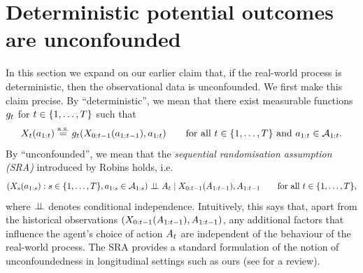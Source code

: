 
\section{Deterministic potential outcomes are unconfounded} \label{eq:deterministic-potential-outcomes-are-unconfounded}

In this section we expand on our earlier claim that, if the real-world process is deterministic, then the observational data is unconfounded.
We first make this claim precise.
By ``deterministic'', we mean that there exist measurable functions $g_t$ for $t \in \{1, \ldots, T\}$ such that
\begin{equation} \label{eq:potential-outcomes-are-deterministic}
    X_t(a_{1:t}) \overset{\mathrm{a.s.}}{=} g_t(X_{0:t-1}(a_{1:t-1}), a_{1:t}) \qquad \text{for all $t \in \{1, \ldots, T\}$ and $a_{1:t} \in \mathcal{A}_{1:t}$.}
\end{equation}
By ``unconfounded'', we mean that the \emph{sequential randomisation assumption (SRA)} introduced by Robins \citep{robins1986new} holds, i.e.\
\begin{equation} \label{eq:actions-are-unconfounded}
    (X_{s}(a_{1:s}) : s \in \{1, \ldots, T\}, a_{1:s} \in \mathcal{A}_{1:s}) \perp\!\!\!\perp A_t \mid X_{0:t-1}(A_{1:t-1}), A_{1:t-1} \qquad \text{for all $t \in \{1, \ldots, T\}$},
\end{equation}
where $\perp\!\!\!\perp$ denotes conditional independence.
Intuitively, this says that, apart from the historical observations $(X_{0:t-1}(A_{1:t-1}), A_{1:t-1})$, any additional factors that influence the agent's choice of action $A_t$ are independent of the behaviour of the real-world process.
The SRA provides a standard formulation of the notion of unconfoundedness in longitudinal settings such as ours (see \cite[Chapter 5]{tsiatis2019dynamic} for a review).


